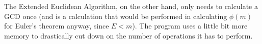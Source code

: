 \documentclass{article}
\begin{document}
\begin{enumerate}
\begin{enumerate}
        The Extended Euclidean Algorithm, on the other hand, only needs to calculate a GCD once (and is a calculation that would be performed in calculating $\phi(m)$ for Euler's theorem anyway, since $E < m$). The program uses a little bit more memory to drastically cut down on the number of operations it has to perform.
    \end{enumerate}
    \end{enumerate}
\end{document}
